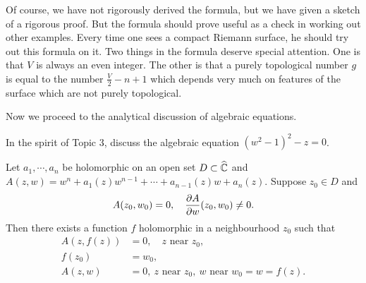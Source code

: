 \documentclass[a4paper,11pt]{article}
\begin{document}
Of course, we have not rigorously derived the formula, but we have
given a sketch of a rigorous proof.  But the formula should prove
useful as a check in working out other examples.  Every time one sees
a compact Riemann surface, he should try out this formula on it.  Two
things in the formula deserve special attention.  One is that $V$ is
always an even integer.  The other is that a purely topological number
$g$ is equal to the number $\frac{V}{2} - n + 1$ which depends very
much on features of the surface which are not purely topological.

\medskip
\begin{mdframed}
Now we proceed to the analytical discussion of algebraic equations.
\end{mdframed}

\begin{ques}
  \label{prob:5}
  In the spirit of Topic 3, discuss the algebraic equation $(w^2 -
  1)^2 - z = 0$.
\end{ques}

\begin{lem}
  \label{lem:1}
  Let $a_1, \cdots, a_n$ be holomorphic on an open set $D \subset
  \widehat{{\mathbb C}}$ and $A(z,w) = w^n + a_1(z) w^{n-1} + \cdots +
  a_{n-1}(z) w + a_n(z)$.
  Suppose $z_0 \in D$ and
  $$
  A(z_0, w_0) = 0,\quad \frac{\partial A}{\partial w}(z_0, w_0) \ne 0.
  $$
  Then there exists a function $f$ holomorphic in a neighbourhood
  $z_0$ such that  
  $$
  \begin{aligned}
    A(z,f(z)) &= 0,\quad z\text{ near }z_0,\\
    f(z_0) &= w_0,\\
    A(z,w) &= 0,\ z\text{ near }z_0,\ w\text{ near }w_0 = w = f(z).
  \end{aligned}
  $$
\end{lem}
\end{document}

